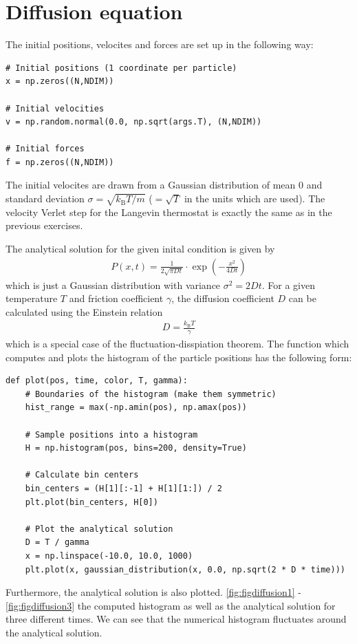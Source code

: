 \documentclass[a4paper,10pt,bibtotoc]{scrartcl}
\begin{document}
\section{Diffusion equation}
The initial positions, velocites and forces are set up in the following way:
\begin{lstlisting}
# Initial positions (1 coordinate per particle)
x = np.zeros((N,NDIM))

# Initial velocities
v = np.random.normal(0.0, np.sqrt(args.T), (N,NDIM))

# Initial forces
f = np.zeros((N,NDIM))
\end{lstlisting}
The initial velocites are drawn from a Gaussian distribution of mean 0 and standard deviation $\sigma = \sqrt{k_\mathrm{B}T/m}$ ($=\sqrt{T}$ in the units which are used).
The velocity Verlet step for the Langevin thermostat is exactly the same as in the previous exercises.

The analytical solution for the given inital condition is given by
\begin{align}
P(x, t) = \frac{1}{2\sqrt{\pi D t}}\cdot \exp\left(-\frac{x^2}{4Dt}\right)
\end{align}
which is just a Gaussian distribution with variance $\sigma^2 = 2Dt$.
For a given temperature $T$ and friction coefficient $\gamma$, the diffusion coefficient $D$ can be calculated using the Einstein relation
\begin{align}
D = \frac{k_\mathrm{B}T}{\gamma}
\end{align}
which is a special case of the fluctuation-disspiation theorem.
The function which computes and plots the histogram of the particle positions has the following form:
\begin{lstlisting}
def plot(pos, time, color, T, gamma):
    # Boundaries of the histogram (make them symmetric)
    hist_range = max(-np.amin(pos), np.amax(pos))

    # Sample positions into a histogram
    H = np.histogram(pos, bins=200, density=True)

    # Calculate bin centers
    bin_centers = (H[1][:-1] + H[1][1:]) / 2
    plt.plot(bin_centers, H[0])

    # Plot the analytical solution
    D = T / gamma
    x = np.linspace(-10.0, 10.0, 1000)
    plt.plot(x, gaussian_distribution(x, 0.0, np.sqrt(2 * D * time)))
\end{lstlisting}
Furthermore, the analytical solution is also plotted.
\autoref{fig:figdiffusion1} - \autoref{fig:figdiffusion3} the computed histogram as well as the analytical solution for three different times.
We can see that the numerical histogram fluctuates around the analytical solution.
\end{document}
